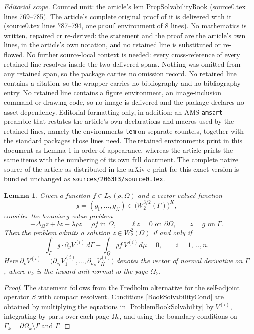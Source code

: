 \documentclass[10pt,a4paper]{amsart}
\newtheorem{lem}{Lemma}
\begin{document}
\noindent\textit{Editorial scope.} Counted unit: the article's lem PropSolvabilityBook (source0.tex lines 769--785). The article's complete original proof of it is delivered with it (source0.tex lines 787--794, one \texttt{proof} environment of 8 lines). No mathematics is written, repaired or re-derived: the statement and the proof are the article's own lines, in the article's own notation, and no retained line is substituted or re-flowed.  No further source-local context is needed: every cross-reference of every retained line resolves inside the two delivered spans.  Nothing was omitted from any retained span, so the package carries no omission record.  No retained line contains a citation, so the wrapper carries no bibliography and no bibliography entry.  No retained line contains a figure environment, an image-inclusion command or drawing code, so no image is delivered and the package declares no asset dependency.  Editorial formatting only, in addition: an AMS \texttt{amsart} preamble that restates the article's own declarations and macros used by the retained lines, namely the environments \texttt{lem} on separate counters, together with the standard packages those lines need.  The retained environments print in this document as Lemma 1 in order of appearance, whereas the article prints the same items with the numbering of its own full document.  The complete native source of the article as distributed in the arXiv e-print for this exact version is bundled unchanged as \texttt{sources/206383/source0.tex}.
\begin{lem}\label{PropSolvabilityBook}
Given a function $f\in L_2(\rho,\Omega)$ and a vector-valued function
$$g=(g_1,\dots,g_K)\in \big(W_2^{3/2}(\Gamma)\big)^K,$$
consider the  boundary value problem
\begin{equation}\label{ProblemBookSolvability}
-\Delta_{\Omega}z+bz-\lambda\rho z=\rho f \text{ in }\Omega,\qquad \ell z=0 \text{ on }\partial\Omega,\qquad
z=g \text{ on }\Gamma.
\end{equation}
Then the problem admits a solution $z\in W_2^2(\Omega)$ if and only if
\begin{equation}\label{BookSolvabilityCond}
 \int_\Gamma g\cdot\partial_\nu V^{(i)}\,d\Gamma + \int_{\Omega} \rho f\,V^{(i)}\,d\mu=0,
\qquad
i=1,\dots,n.
\end{equation}
Here $\partial_\nu V^{(i)}=\bigl(\partial_{\nu_1}V^{(i)}_1,\dots,\partial_{\nu_K}V^{(i)}_K\bigr)$ denotes the vector of normal derivative on $\Gamma$, where
$\nu_k$ is the inward unit normal to the page $\Omega_k$.
\end{lem}

\begin{proof}
The statement follows from the Fredholm alternative for the
self-adjoint operator $S$ with compact resolvent.
Conditions \eqref{BookSolvabilityCond} are obtained by multiplying
the equations in \eqref{ProblemBookSolvability} by $V^{(i)}$,
integrating by parts over each page $\Omega_k$, and using the
boundary conditions on $\Gamma_k=\partial\Omega_k\setminus\Gamma$ and $\Gamma$.
\end{proof}
\end{document}
